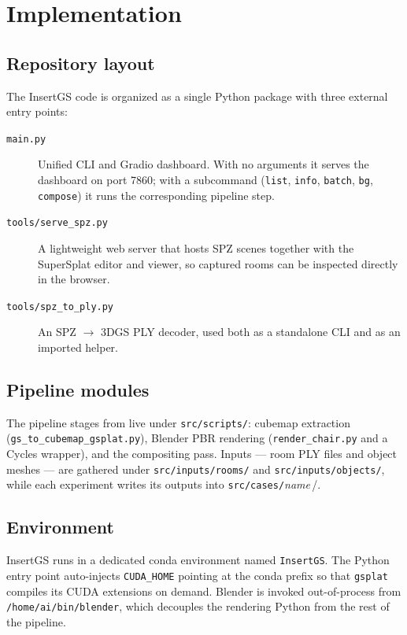 
\chapter{Implementation}\label{chapter:implementation}

\section{Repository layout}

The InsertGS code is organized as a single Python package with three
external entry points:

\begin{description}
  \item[\texttt{main.py}] Unified CLI and Gradio dashboard. With no
    arguments it serves the dashboard on port 7860; with a subcommand
    (\texttt{list}, \texttt{info}, \texttt{batch}, \texttt{bg},
    \texttt{compose}) it runs the corresponding pipeline step.
  \item[\texttt{tools/serve\_spz.py}] A lightweight web server that hosts
    \ac{SPZ} scenes together with the SuperSplat editor and viewer, so
    captured rooms can be inspected directly in the browser.
  \item[\texttt{tools/spz\_to\_ply.py}] An \ac{SPZ} $\to$ 3DGS \ac{PLY}
    decoder, used both as a standalone CLI and as an imported helper.
\end{description}

\section{Pipeline modules}

The pipeline stages from  live under
\texttt{src/scripts/}: cubemap extraction
(\texttt{gs\_to\_cubemap\_gsplat.py}), Blender PBR rendering
(\texttt{render\_chair.py} and a Cycles wrapper), and the compositing pass.
Inputs --- room PLY files and object meshes --- are gathered under
\texttt{src/inputs/rooms/} and \texttt{src/inputs/objects/}, while each
experiment writes its outputs into \texttt{src/cases/}\textit{name}\,/.

\section{Environment}

InsertGS runs in a dedicated conda environment named \texttt{InsertGS}.
The Python entry point auto-injects \texttt{CUDA\_HOME} pointing at the
conda prefix so that \texttt{gsplat} compiles its CUDA extensions on
demand. Blender is invoked out-of-process from
\texttt{/home/ai/bin/blender}, which decouples the rendering Python from
the rest of the pipeline.

